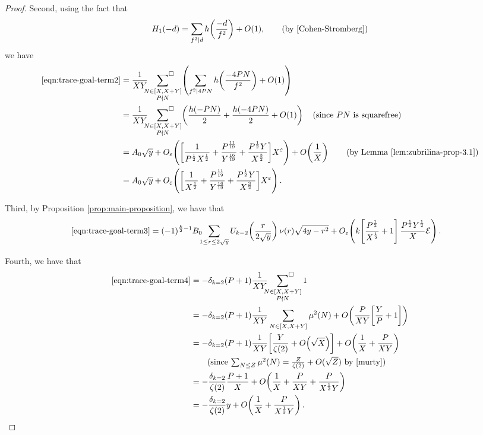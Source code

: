 \documentclass[12pt,letterpaper,reqno]{amsart}
\theoremstyle{plain}
\theoremstyle{definition}
\numberwithin{equation}{section}
\numberwithin{figure}{section}
\numberwithin{table}{section}
\newcommand{\lrp}[1]{\!\left(#1\right)}
\newcommand{\lrb}[1]{\!\left[#1\right]}
\newcommand{\EE}{\mathcal{E}}
\begin{document}
\begin{proof}
Second, using the fact that
\begin{align}
    H_1(-d)=\sum_{ f^2\mid d}h\lrp{\frac{-d}{f^2}}+O(1), \qquad \text{(by 
    \cite[Definition 3.4.18]{Cohen-Stromberg})}
\end{align}
we have 
\begin{align}
    \eqref{eqn:trace-goal-term2}
    &= \frac{1}{XY} \sideset{}{^\square} \sum_{\substack{N \in [X, X+Y] \\ P \nmid N}}
    \lrp{
        \sum_{f^2 \mid 4PN} h\lrp{\frac{-4PN}{f^2}} + O(1) 
    }
    \\
    &= \frac{1}{XY} \sideset{}{^\square} \sum_{\substack{N \in [X, X+Y] \\ P \nmid N}} \lrp{\frac{h(-PN)}{2}+\frac{h(-4PN)}{2}+O(1)}
    \quad \text{(since $PN$ is squarefree)}
    \\
    &= A_0\sqrt{y} + O_\varepsilon\lrp{\bigg[\frac{1}{P^\frac{1}{2}X^\frac{1}{2}} + \frac{P^{\frac{11}{19}}}{Y^{\frac{16}{19}}} + \frac{P^\frac{1}{2}Y}{X^{\frac{3}{2}}}\bigg] X^\varepsilon} + O\lrp{\frac{1}{X}} \qquad \text{(by Lemma \ref{lem:zubrilina-prop-3.1})} \\
    &= A_0\sqrt{y} + O_\varepsilon\lrp{\bigg[\frac{1}{X^\frac{1}{2}} + \frac{P^{\frac{11}{19}}}{Y^{\frac{16}{19}}} + \frac{P^\frac{1}{2}Y}{X^{\frac{3}{2}}}\bigg] X^\varepsilon}.
\end{align} 


Third, by Proposition \ref{prop:main-proposition}, we have that
\begin{align}
    \eqref{eqn:trace-goal-term3} 
    & =(-1)^{\frac{k}{2}-1} B_0\!\!\!\sum_{1\leq r\leq 2\sqrt{y}}U_{k-2}\lrp{\frac{r}{2\sqrt{y}}}\nu(r)\sqrt{4y-r^2} 
       +
       O_\varepsilon\lrp{ k
        \lrb{
            \frac{P^\frac{1}{2}}{X^\frac{1}{2}}
            + 1
        }
        \frac{P^\frac{1}{2} Y^\frac{1}{2}}{X}
        \EE
       }.
\end{align}


Fourth, we have that
\begin{align}
    \eqref{eqn:trace-goal-term4} 
    &= -\delta_{k=2}  (P+1) \frac{1}{XY} \sideset{}{^\square}\sum_{\substack{N \in [X, X+Y] \\ P \nmid N}} 1 \\
    &= -\delta_{k=2}  (P+1) \frac{1}{XY} \sum_{\substack{N \in [X, X+Y]}} \mu^2(N) + O\lrp{\frac{P}{XY}\lrb{\frac{Y}{P}+1}} \\
    &= -\delta_{k=2}  (P+1) \frac{1}{XY} 
    \lrb{
        \frac{Y}{\zeta(2)} + O\lrp{\sqrt X}
    }
    + O\lrp{\frac{1}{X} + \frac{P}{XY}} \\
    &\qquad \text{(since $\textstyle \sum_{N\le Z} \mu^2(N) = \frac{Z}{\zeta(2)} + O(\sqrt Z)$ by \cite[Exercise 4.4.10]{murty})} \\
    &= -\frac{\delta_{k=2}}{\zeta(2)}   \frac{P+1}{X}
    + O\lrp{\frac{1}{X} + \frac{P}{XY} + \frac{P}{X^\frac{1}{2}Y}} \\
    &= -\frac{\delta_{k=2}}{\zeta(2)}   y
    + O\lrp{\frac{1}{X} + \frac{P}{X^\frac{1}{2}Y}}.
\end{align}



\end{proof}
\end{document}
